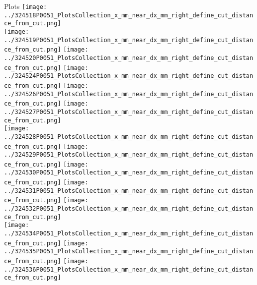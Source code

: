 \documentclass{beamer}
\begin{document}
\begin{frame}
\begin{block}{Plots}
                \texttt{[image: ../324518P0051\_PlotsCollection\_x\_mm\_near\_dx\_mm\_right\_define\_cut\_distance\_from\_cut.png]}\\
                \texttt{[image: ../324519P0051\_PlotsCollection\_x\_mm\_near\_dx\_mm\_right\_define\_cut\_distance\_from\_cut.png]}
                \texttt{[image: ../324520P0051\_PlotsCollection\_x\_mm\_near\_dx\_mm\_right\_define\_cut\_distance\_from\_cut.png]}
                \texttt{[image: ../324524P0051\_PlotsCollection\_x\_mm\_near\_dx\_mm\_right\_define\_cut\_distance\_from\_cut.png]}
                \texttt{[image: ../324526P0051\_PlotsCollection\_x\_mm\_near\_dx\_mm\_right\_define\_cut\_distance\_from\_cut.png]}
                \texttt{[image: ../324527P0051\_PlotsCollection\_x\_mm\_near\_dx\_mm\_right\_define\_cut\_distance\_from\_cut.png]}\\
                \texttt{[image: ../324528P0051\_PlotsCollection\_x\_mm\_near\_dx\_mm\_right\_define\_cut\_distance\_from\_cut.png]}
                \texttt{[image: ../324529P0051\_PlotsCollection\_x\_mm\_near\_dx\_mm\_right\_define\_cut\_distance\_from\_cut.png]}
                \texttt{[image: ../324530P0051\_PlotsCollection\_x\_mm\_near\_dx\_mm\_right\_define\_cut\_distance\_from\_cut.png]}
                \texttt{[image: ../324531P0051\_PlotsCollection\_x\_mm\_near\_dx\_mm\_right\_define\_cut\_distance\_from\_cut.png]}
                \texttt{[image: ../324532P0051\_PlotsCollection\_x\_mm\_near\_dx\_mm\_right\_define\_cut\_distance\_from\_cut.png]}\\
                \texttt{[image: ../324534P0051\_PlotsCollection\_x\_mm\_near\_dx\_mm\_right\_define\_cut\_distance\_from\_cut.png]}
                \texttt{[image: ../324535P0051\_PlotsCollection\_x\_mm\_near\_dx\_mm\_right\_define\_cut\_distance\_from\_cut.png]}
                \texttt{[image: ../324536P0051\_PlotsCollection\_x\_mm\_near\_dx\_mm\_right\_define\_cut\_distance\_from\_cut.png]}

        \end{block}
\end{frame}
\end{document}
